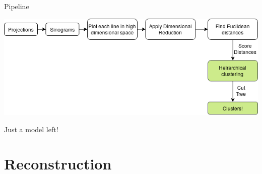 \documentclass[t, 11pt, xcolor=dvipsnames]{beamer}
\newcommand{\placetextbox}[4][center]{%
  \tikz[remember picture,overlay,x=\paperwidth,y=\paperheight]{%
    \node[anchor=#1,inner sep=0pt]
    at ($(current page.south west)+(#2,#3)$) {#4};
  }%
}
\begin{document}
\begin{frame}[fragile]{Pipeline}
  \begin{center}\includegraphics[width=1\textwidth]{images/third_pipeline.png}
    \end{center}


    \pause
    Just a model left!
\end{frame}

\section{Reconstruction}
\end{document}
